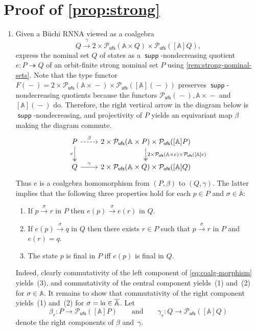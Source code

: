 \documentclass[final,a4paper,UKenglish,thm-restate,autoref,numberwithinsect]{lipics-v2021}
\newcommand{\midmid}{\hspace{0.2ex}{\rule[-0.1ex]{0.6pt}{1.65ex}}\hspace{0.2ex}}
\newcommand{\newletter}[1]{{\midmid}#1}
\newcommand{\barA}{\overline{\names}}
\numberwithin{equation}{section}
\newcommand{\epito}{\twoheadrightarrow}
\newcommand{\xto}[1]{\xrightarrow{~#1~}}
\newcommand{\dash}{\mathop{-}}
\newcommand{\+}[1]{\mathcal{#1}\xspace}
\newcommand{\Pow}{\mathcal{P}}
\newcommand{\ufs}{{\mathsf{ufs}}}
\newcommand{\names}{\mathbb{A}}
\DeclareMathOperator{\supp}{\mathsf{supp}} %
\theoremstyle{definition}
\begin{document}
\section*{Proof of \autoref{prop:strong}}
  \begin{enumerate}
  \item Given a Büchi RNNA viewed as a coalgebra
    \[
      Q\xto{\gamma} 2\times \Pow_\ufs(\names\times Q)\times
      \Pow_\ufs([\names]Q),
    \]
    express the nominal set $Q$ of states as a $\supp$-nondecreasing
    quotient $e\colon P\epito Q$ of an orbit-finite strong nominal set
    $P$ using \autoref{rem:strong-nominal-sets}. Note that the type
    functor
    $F(\dash) = 2\times \Pow_\ufs(\names\times \dash)\times
    \Pow_\ufs([\names](\dash))$ preserves $\supp$-nondecreasing quotients
    because the functors
    $\Pow_\ufs(\dash), \names\times \dash$ and $[\names](\dash)$
    do. Therefore, the right vertical arrow in the diagram below is
    $\supp$-nondecreasing, and projectivity of $P$ yields an equivariant
    map $\beta$ making the diagram commute.
    \begin{equation}\label{eq:coalg-morphism}
      \begin{tikzcd}
        P \ar[d,"e"', two heads] \ar[dashed]{r}{\beta}
        &
        2\times \Pow_\ufs(\names\times P)\times \Pow_\ufs([\names]P)
        \ar[d,"2\times \Pow_\ufs(\names\times e)\times
        \Pow_\ufs({[\names]}e)", two heads]
        \\
        Q \ar[r,"\gamma"]
        &
        2\times \Pow_\ufs(\names\times Q)\times \Pow_\ufs([\names]Q) 
      \end{tikzcd}
    \end{equation}
    Thus $e$ is a coalgebra homomorphism from $(P,\beta)$ to
    $(Q,\gamma)$. The latter implies that the following three
    properties hold for each $p\in P$ and $\sigma\in \barA$:
    \begin{enumerate}[(1)]
    \item\label{hom1} If $p\xto{\sigma} r$ in $P$ then $e(p)\xto{\sigma} e(r)$ in $Q$.
    \item\label{hom2} If $e(p)\xto{\sigma} q$ in $Q$ then there exists
      $r\in P$ such that $p\xto{\sigma} r$ in $P$ and $e(r)=q$.
    \item\label{hom3} The state $p$ is final in $P$ iff $e(p)$ is final in $Q$.
    \end{enumerate}
    Indeed, clearly commutativity of the left component of
    \eqref{eq:coalg-morphism} yields~(3), and commutativity of the
    central component yields~(1) and~(2) for
    $\sigma\in \names$. It remains to show that commutativity of the right
    component yields~(1) and~(2) for $\sigma=\newletter a\in \barA$. Let
    \[\beta_r\colon P\to \Pow_\ufs([\names]P)\qquad\text{and}\qquad \gamma_r\colon Q\to \Pow_\ufs([\names]Q)\] denote the right
    components of $\beta$ and~$\gamma$.


\end{enumerate}
\end{document}
